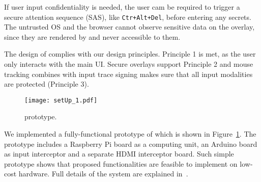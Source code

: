 If user input confidentiality is needed, the user cam be required to trigger a secure attention sequence (SAS), like \texttt{Ctr+Alt+Del}, before entering any secrets. The untrusted OS and the browser cannot observe sensitive data on the overlay, since they are rendered by \hub and never accessible to them.

The design of \protection complies with our design principles. Principle 1 is met, as the user only interacts with the main UI. Secure overlays support Principle 2 and mouse tracking combines with input trace signing makes sure that all input modalities are protected (Principle 3).

\begin{figure}[t]
	\centering
	\texttt{[image: setUp\_1.pdf]}
	\caption{\protection prototype.}
\label{fig:prototype}   
\end{figure}

We implemented a fully-functional prototype of \protection which is shown in Figure~\ref{fig:prototype}. The prototype includes a Raspberry Pi board as a computing unit, an Arduino board as input interceptor and a separate HDMI interceptor board. Such simple prototype shows that proposed functionalities are feasible to implement on low-cost hardware. Full details of the \protection system are explained in~\cite{protection}.

